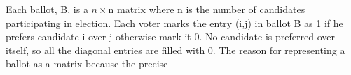 \documentclass{llncs}
\begin{document}
  Each ballot, B, is a $n\times$n matrix where n is the number of candidates 
  participating in
  election. Each voter marks the entry (i,j) in ballot B as 1 if he prefers 
  candidate i over j
  otherwise mark it 0. No candidate is preferred over itself, so all the 
  diagonal entries are 
  filled with 0. 
  The reason for representing a ballot as a matrix because the precise 
\end{document}
